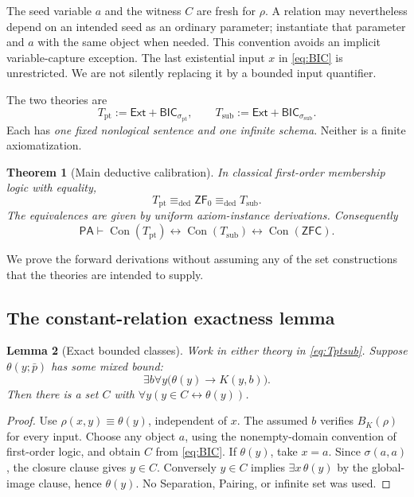 \documentclass[11pt,letterpaper]{article}
\newtheorem{theorem}{Theorem}[section]
\newtheorem{lemma}[theorem]{Lemma}
\theoremstyle{definition}\newtheorem{definition}[theorem]{Definition}
\theoremstyle{remark}\newtheorem{remark}[theorem]{Remark}
\newcommand{\PA}{\mathsf{PA}}
\newcommand{\ZFC}{\mathsf{ZFC}}
\newcommand{\ZFz}{\mathsf{ZF}_{0}}
\newcommand{\Ext}{\mathsf{Ext}}
\newcommand{\Con}{\operatorname{Con}}
\newcommand{\BIC}{\mathsf{BIC}}
\newcommand{\eqd}{\mathrel{\equiv_{\mathrm{ded}}}}
\newcommand{\Tpt}{T_{\mathrm{pt}}}
\newcommand{\Tsub}{T_{\mathrm{sub}}}
\newcommand{\ps}{\bar p}
\begin{document}
The seed variable $a$ and the witness $C$ are fresh for $\rho$.
A relation may nevertheless depend on an intended seed as an ordinary
parameter; instantiate that parameter and $a$ with the same object when
needed. This convention avoids an implicit variable-capture exception.
The last existential input $x$ in \eqref{eq:BIC} is unrestricted.
We are not silently replacing it by a bounded input quantifier.

The two theories are
\begin{equation}\label{eq:Tptsub}
 \Tpt:=\Ext+\BIC_{\sigma_{\mathrm{pt}}},
 \qquad
 \Tsub:=\Ext+\BIC_{\sigma_{\mathrm{sub}}}.
\end{equation}
Each has \emph{one fixed nonlogical sentence and one infinite schema}.
Neither is a finite axiomatization.

\begin{theorem}[Main deductive calibration]\label{thm:main}
In classical first-order membership logic with equality,
\[
 \Tpt\eqd\ZFz\eqd\Tsub.
\]
The equivalences are given by uniform axiom-instance derivations.
Consequently
\[
 \PA\vdash\Con(\Tpt)\leftrightarrow\Con(\Tsub)
                \leftrightarrow\Con(\ZFC).
\]
\end{theorem}

We prove the forward derivations without assuming any of the set
constructions that the theories are intended to supply.

\subsection{The constant-relation exactness lemma}

\begin{lemma}[Exact bounded classes]\label{lem:constant}
Work in either theory in \eqref{eq:Tptsub}. Suppose $\theta(y;\ps)$ has
some mixed bound:
\[
 \exists b\forall y\bigl(\theta(y)\to K(y,b)\bigr).
\]
Then there is a set $C$ with
$\forall y(y\in C\leftrightarrow\theta(y))$.
\end{lemma}
\begin{proof}
Use $\rho(x,y)\equiv\theta(y)$, independent of $x$. The assumed $b$
verifies $B_K(\rho)$ for every input. Choose any object $a$, using the
nonempty-domain convention of first-order logic, and obtain $C$ from
\eqref{eq:BIC}. If $\theta(y)$, take $x=a$. Since $\sigma(a,a)$,
the closure clause gives $y\in C$. Conversely $y\in C$ implies
$\exists x\,\theta(y)$ by the global-image clause, hence $\theta(y)$.
No Separation, Pairing, or infinite set was used.
\end{proof}
\end{document}
